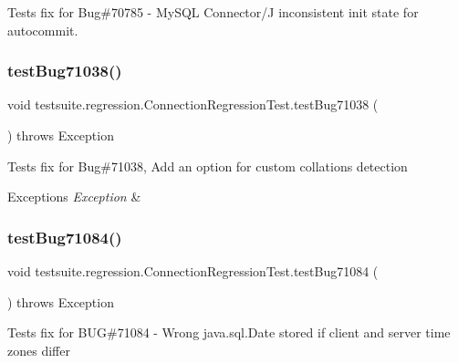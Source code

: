 Tests fix for Bug\#70785 -\/ My\+S\+QL Connector/J inconsistent init state for autocommit. \mbox{\label{classtestsuite_1_1regression_1_1_connection_regression_test_af4f6635f25a74604468a8f9445e365ba}} 
\subsubsection{\texorpdfstring{test\+Bug71038()}{testBug71038()}}
{\footnotesize\ttfamily void testsuite.\+regression.\+Connection\+Regression\+Test.\+test\+Bug71038 (\begin{DoxyParamCaption}{ }\end{DoxyParamCaption}) throws Exception}

Tests fix for Bug\#71038, Add an option for custom collations detection


\begin{DoxyExceptions}{Exceptions}
{\em Exception} & \\
\hline
\end{DoxyExceptions}
\mbox{\label{classtestsuite_1_1regression_1_1_connection_regression_test_aa979b5c63116b99ad91121c84a0af973}} 
\subsubsection{\texorpdfstring{test\+Bug71084()}{testBug71084()}}
{\footnotesize\ttfamily void testsuite.\+regression.\+Connection\+Regression\+Test.\+test\+Bug71084 (\begin{DoxyParamCaption}{ }\end{DoxyParamCaption}) throws Exception}

Tests fix for B\+UG\#71084 -\/ Wrong java.\+sql.\+Date stored if client and server time zones differ


